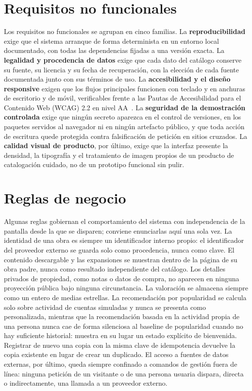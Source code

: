 \section{Requisitos no funcionales}\label{sec:req-no-funcionales}

Los requisitos no funcionales se agrupan en cinco familias. La \textbf{reproducibilidad} exige
que el sistema arranque de forma determinista en un entorno local documentado, con todas las
dependencias fijadas a una versión exacta. La \textbf{legalidad y procedencia de datos} exige
que cada dato del catálogo conserve su fuente, su licencia y su fecha de recuperación, con la
elección de cada fuente documentada junto con sus términos de uso. La
\textbf{accesibilidad y el diseño responsive} exigen que los flujos principales funcionen con
teclado y en anchuras de escritorio y de móvil, verificables frente a las Pautas de
Accesibilidad para el Contenido Web (WCAG) 2.2 en nivel AA~\cite{wcag22}. La
\textbf{seguridad de la demostración controlada} exige que ningún secreto aparezca en el
control de versiones, en los paquetes servidos al navegador ni en ningún artefacto público, y
que toda acción de escritura quede protegida contra falsificación de petición en sitios
cruzados. La \textbf{calidad visual de producto}, por último, exige que la interfaz presente
la densidad, la tipografía y el tratamiento de imagen propios de un producto de catalogación
cuidado, no de un prototipo funcional sin pulir.

\section{Reglas de negocio}\label{sec:req-reglas}

Algunas reglas gobiernan el comportamiento del sistema con independencia de la pantalla desde
la que se disparen; conviene enunciarlas aquí una sola vez. La identidad de una obra es
siempre un identificador interno propio: el identificador del proveedor externo se guarda solo
como procedencia, nunca como clave. El contenido descargable y las expansiones se muestran
dentro de la página de su obra padre, nunca como resultado independiente del catálogo. Los
detalles privados de propiedad, como notas o datos de compra, no aparecen en ninguna
proyección pública bajo ninguna circunstancia. La valoración se almacena siempre como un entero
de medias estrellas. La recomendación por popularidad se calcula solo sobre actividad de
cuentas simuladas y nunca se presenta como personalizada, mientras que la recomendación
basada en la actividad propia de una persona nunca cae de forma silenciosa al baseline de
popularidad cuando no hay suficiente historial: muestra en su lugar un estado explícito de
bienvenida. Registrar de nuevo una copia con la misma clave de idempotencia devuelve la copia
existente en lugar de crear un duplicado. El acceso a fuentes de datos externas, por último,
queda siempre confinado a comandos de gestión fuera de línea: ninguna petición de un visitante o de una
persona usuaria dispara, directa o indirectamente, una llamada a un proveedor externo.

